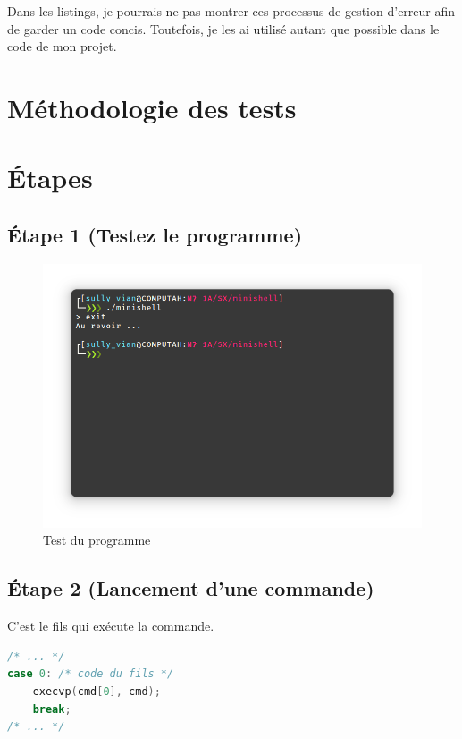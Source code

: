 \documentclass{article}
\begin{document}
Dans les listings, je pourrais ne pas montrer ces processus de gestion d'erreur afin de garder un code concis. Toutefois, je les ai utilisé autant que possible dans le code de mon projet.

\section{Méthodologie des tests}


\section{Étapes}

\subsection*{Étape 1 (Testez le programme)}

\begin{figure}[H]
    \centering
    \includegraphics[width=1\textwidth]{./resources/E1.png}
    \caption{Test du programme}
\end{figure}

\subsection*{Étape 2 (Lancement d'une commande)}

C'est le fils qui exécute la commande.

\begin{lstlisting}[language=C, caption=Code de la question 2]
/* ... */
case 0: /* code du fils */
    execvp(cmd[0], cmd);
    break;
/* ... */
\end{lstlisting}
\end{document}
